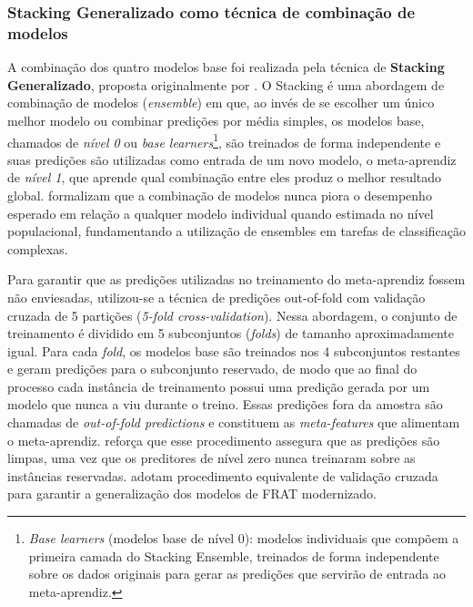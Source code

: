 \documentclass[english,brazilian]{UNISINOSartigo}
\begin{document}
\subsubsection{Stacking Generalizado como técnica de combinação de modelos}

A combinação dos quatro modelos base foi realizada pela técnica de
\textbf{Stacking Generalizado}, proposta originalmente por .
O Stacking é uma abordagem de combinação de modelos (\textit{ensemble}) em que,
ao invés de se escolher um único melhor modelo ou combinar predições por média
simples, os modelos base, chamados de \textit{nível 0} ou
\textit{base learners}\footnote{\textit{Base learners} (modelos base de nível
0): modelos individuais que compõem a primeira camada do Stacking Ensemble,
treinados de forma independente sobre os dados originais para gerar as
predições que servirão de entrada ao meta-aprendiz.}, são treinados de forma
independente e suas predições são utilizadas
como entrada de um novo modelo, o meta-aprendiz de \textit{nível 1}, que aprende
qual combinação entre eles produz o melhor resultado global.
 formalizam que a combinação de modelos nunca piora o
desempenho esperado em relação a qualquer modelo individual quando estimada no
nível populacional, fundamentando a utilização de ensembles em tarefas de
classificação complexas.

Para garantir que as predições utilizadas no treinamento do meta-aprendiz fossem
não enviesadas, utilizou-se a técnica de predições out-of-fold com
validação cruzada de 5 partições (\textit{5-fold cross-validation}). Nessa
abordagem, o conjunto de treinamento é dividido em 5 subconjuntos (\textit{folds})
de tamanho aproximadamente igual. Para cada \textit{fold}, os modelos base são
treinados nos 4 subconjuntos restantes e geram predições para o subconjunto
reservado, de modo que ao final do processo cada instância de treinamento possui
uma predição gerada por um modelo que nunca a viu durante o treino. Essas
predições fora da amostra são chamadas de \textit{out-of-fold predictions} e
constituem as \textit{meta-features} que alimentam o meta-aprendiz.
 reforça que esse procedimento assegura que as predições
são limpas, uma vez que os preditores de nível zero nunca treinaram sobre as
instâncias reservadas.  adotam procedimento equivalente
de validação cruzada para garantir a generalização dos modelos de FRAT
modernizado.
\end{document}
